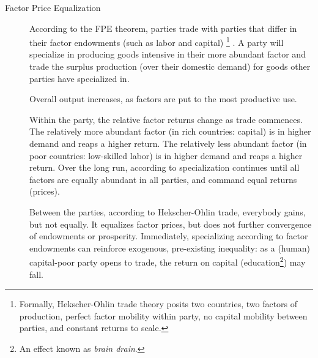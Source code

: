 \begin{description}

	\item[Factor Price Equalization] \label{itm:FPE} According to the \gls{FPE} theorem, parties trade with parties that differ in their factor endowments (such as labor and capital) \footnote{
		Formally, Hekscher-Ohlin trade theory posits two countries, two factors of production, perfect factor mobility within party, no capital mobility between parties, and constant returns to scale.} 
	\citep{Stolper1941}. A party will specialize in producing goods intensive in their more abundant factor and trade the surplus production (over their domestic demand) for goods other parties have specialized in. 
	
	Overall output increases, as factors are put to the most productive use.

	Within the party, the relative factor returns change as trade commences. The relatively more abundant factor (in rich countries: capital) is in higher demand and reaps a higher return. The relatively less abundant factor (in poor countries: low-skilled labor) is in higher demand and reaps a higher return. Over the long run, according to \cite{Stolper1941} specialization continues until all factors are equally abundant in all parties, and command equal returns (prices).
	
	Between the parties, according to Hekscher-Ohlin trade, everybody gains, but not equally. It equalizes factor prices, but does not further convergence of endowments or prosperity. Immediately, specializing according to factor endowments can reinforce exogenous, pre-existing inequality: as a (human) capital-poor party opens to trade, the return on capital (education\footnote{
		An effect known as \emph{brain drain}.}) 
	may fall.


\end{description}
